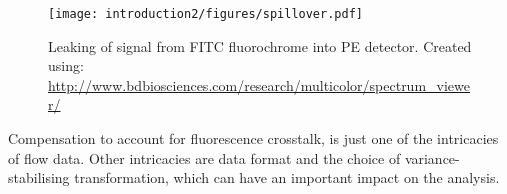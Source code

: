 \begin{figure} [h]
\begin{center}
   \texttt{[image: introduction2/figures/spillover.pdf]}
\end{center}
{ Leaking of signal from FITC fluorochrome into PE detector.}
{
  \small{Created using: \url{http://www.bdbiosciences.com/research/multicolor/spectrum_viewer/}}
}
\end{figure}



Compensation to account for fluorescence crosstalk, is just one of the intricacies of flow data.
Other intricacies are data format
and the choice of variance-stabilising transformation,
which can have an important impact on the analysis.


